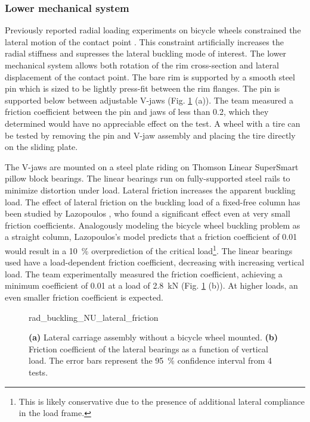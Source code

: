 \documentclass[\rootdir/thesis.tex]{subfiles}
\begin{document}
\subsubsection*{Lower mechanical system}
Previously reported radial loading experiments on bicycle wheels constrained the lateral motion of the contact point \cite{Burgoyne1993,RARblog,McLundie2007}. This constraint artificially increases the radial stiffness and supresses the lateral buckling mode of interest. The lower mechanical system allows both rotation of the rim cross-section and lateral displacement of the contact point. The bare rim is supported by a smooth steel pin which is sized to be lightly press-fit between the rim flanges. The pin is supported below between adjustable V-jaws (Fig. \ref{fig:rad_buckling_NU_lateral_friction} (a)). The team measured a friction coefficient between the pin and jaws of less than 0.2, which they determined would have no appreciable effect on the test. A wheel with a tire can be tested by removing the pin and V-jaw assembly and placing the tire directly on the sliding plate.

The V-jaws are mounted on a steel plate riding on Thomson Linear SuperSmart pillow block bearings. The linear bearings run on fully-supported steel rails to minimize distortion under load. Lateral friction increases the apparent buckling load. The effect of lateral friction on the buckling load of a fixed-free column has been studied by Lazopoulos \cite{Lazopoulos1991}, who found a significant effect even at very small friction coefficients. Analogously modeling the bicycle wheel buckling problem as a straight column, Lazopoulos's model predicts that a friction coefficient of 0.01 would result in a \SI{10}{\percent} overprediction of the critical load\footnote{This is likely conservative due to the presence of additional lateral compliance in the load frame.}. The linear bearings used have a load-dependent friction coefficient, decreasing with increasing vertical load. The team experimentally measured the friction coefficient, achieving a minimum coefficient of 0.01 at a load of \SI{2.8}{\kilo\newton} (Fig. \ref{fig:rad_buckling_NU_lateral_friction} (b)). At higher loads, an even smaller friction coefficient is expected.

\begin{figure}[t]
\centering
{rad_buckling_NU_lateral_friction}
\caption[Lateral carriage assembly]{\textbf{(a)} Lateral carriage assembly without a bicycle wheel mounted. \textbf{(b)} Friction coefficient of the lateral bearings as a function of vertical load. The error bars represent the \SI{95}{\percent} confidence interval from 4 tests.}
\label{fig:rad_buckling_NU_lateral_friction}
\end{figure}
\end{document}
